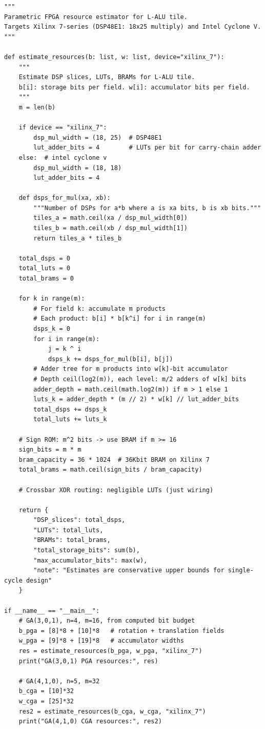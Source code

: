 \documentclass[11pt,a4paper]{article}
\theoremstyle{definition}
\theoremstyle{plain}
\theoremstyle{remark}
\begin{document}
\begin{lstlisting}[caption={FPGA resource estimation from L-Rep parameters},label=lst:fpga]
"""
Parametric FPGA resource estimator for L-ALU tile.
Targets Xilinx 7-series (DSP48E1: 18x25 multiply) and Intel Cyclone V.
"""

def estimate_resources(b: list, w: list, device="xilinx_7"):
    """
    Estimate DSP slices, LUTs, BRAMs for L-ALU tile.
    b[i]: storage bits per field. w[i]: accumulator bits per field.
    """
    m = len(b)
    
    if device == "xilinx_7":
        dsp_mul_width = (18, 25)  # DSP48E1
        lut_adder_bits = 4        # LUTs per bit for carry-chain adder
    else:  # intel cyclone v
        dsp_mul_width = (18, 18)
        lut_adder_bits = 4
    
    def dsps_for_mul(xa, xb):
        """Number of DSPs for a*b where a is xa bits, b is xb bits."""
        tiles_a = math.ceil(xa / dsp_mul_width[0])
        tiles_b = math.ceil(xb / dsp_mul_width[1])
        return tiles_a * tiles_b
    
    total_dsps = 0
    total_luts = 0
    total_brams = 0
    
    for k in range(m):
        # For field k: accumulate m products
        # Each product: b[i] * b[k^i] for i in range(m)
        dsps_k = 0
        for i in range(m):
            j = k ^ i
            dsps_k += dsps_for_mul(b[i], b[j])
        # Adder tree for m products into w[k]-bit accumulator
        # Depth ceil(log2(m)), each level: m/2 adders of w[k] bits
        adder_depth = math.ceil(math.log2(m)) if m > 1 else 1
        luts_k = adder_depth * (m // 2) * w[k] // lut_adder_bits
        total_dsps += dsps_k
        total_luts += luts_k
    
    # Sign ROM: m^2 bits -> use BRAM if m >= 16
    sign_bits = m * m
    bram_capacity = 36 * 1024  # 36Kbit BRAM on Xilinx 7
    total_brams = math.ceil(sign_bits / bram_capacity)
    
    # Crossbar XOR routing: negligible LUTs (just wiring)
    
    return {
        "DSP_slices": total_dsps,
        "LUTs": total_luts,
        "BRAMs": total_brams,
        "total_storage_bits": sum(b),
        "max_accumulator_bits": max(w),
        "note": "Estimates are conservative upper bounds for single-cycle design"
    }

if __name__ == "__main__":
    # GA(3,0,1), n=4, m=16, from computed bit budget
    b_pga = [8]*8 + [10]*8   # rotation + translation fields
    w_pga = [9]*8 + [19]*8   # accumulator widths
    res = estimate_resources(b_pga, w_pga, "xilinx_7")
    print("GA(3,0,1) PGA resources:", res)
    
    # GA(4,1,0), n=5, m=32
    b_cga = [10]*32
    w_cga = [25]*32
    res2 = estimate_resources(b_cga, w_cga, "xilinx_7")
    print("GA(4,1,0) CGA resources:", res2)
\end{lstlisting}
\end{document}
